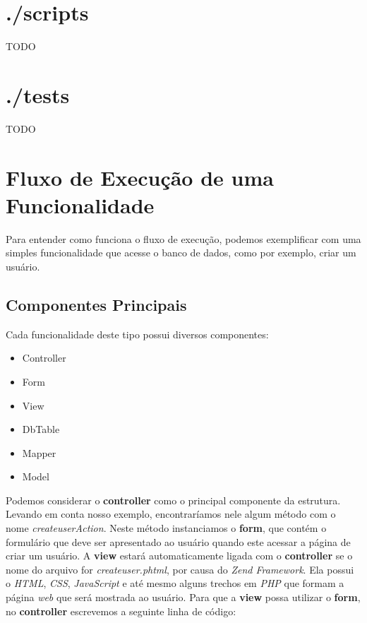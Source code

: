 
\section{./scripts}
TODO


\section{./tests}
TODO


\section{Fluxo de Execução de uma Funcionalidade}
Para entender como funciona o fluxo de execução, podemos exemplificar com uma simples funcionalidade que acesse o banco de dados, como por exemplo, criar um usuário.

\subsection{Componentes Principais}

Cada funcionalidade deste tipo possui diversos componentes:
    \begin{itemize}
        \item Controller
        \item Form
        \item View
        \item DbTable
        \item Mapper
        \item Model
    \end{itemize}

Podemos considerar o \textbf{controller} como o principal componente da estrutura. Levando em conta nosso exemplo, encontraríamos nele algum método com o nome \textit{createuserAction}. Neste método instanciamos o \textbf{form}, que contém o formulário que deve ser apresentado ao usuário quando este acessar a página de criar um usuário. A \textbf{view} estará automaticamente ligada com o \textbf{controller} se o nome do arquivo for \textit{createuser.phtml}, por causa do \textit{Zend Framework}. Ela possui o \textit{HTML}, \textit{CSS}, \textit{JavaScript} e até mesmo alguns trechos em \textit{PHP} que formam a página \textit{web} que será mostrada ao usuário. Para que a \textbf{view} possa utilizar o \textbf{form}, no \textbf{controller} escrevemos a seguinte linha de código:

